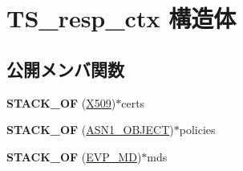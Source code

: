 \hypertarget{struct_t_s__resp__ctx}{}\section{T\+S\+\_\+resp\+\_\+ctx 構造体}
\label{struct_t_s__resp__ctx}
\subsection*{公開メンバ関数}
\begin{DoxyCompactItemize}
\item 
\hypertarget{struct_t_s__resp__ctx_aef18708d27bbe62bff39215781c83cc1}{}{\bfseries S\+T\+A\+C\+K\+\_\+\+O\+F} (\hyperlink{structx509__st}{X509})$\ast$certs\label{struct_t_s__resp__ctx_aef18708d27bbe62bff39215781c83cc1}

\item 
\hypertarget{struct_t_s__resp__ctx_a9f12f42563eb755da572b2e1c41bbee9}{}{\bfseries S\+T\+A\+C\+K\+\_\+\+O\+F} (\hyperlink{structasn1__object__st}{A\+S\+N1\+\_\+\+O\+B\+J\+E\+C\+T})$\ast$policies\label{struct_t_s__resp__ctx_a9f12f42563eb755da572b2e1c41bbee9}

\item 
\hypertarget{struct_t_s__resp__ctx_a4d642effed2757a87aa7d9aad82e6503}{}{\bfseries S\+T\+A\+C\+K\+\_\+\+O\+F} (\hyperlink{structenv__md__st}{E\+V\+P\+\_\+\+M\+D})$\ast$mds\label{struct_t_s__resp__ctx_a4d642effed2757a87aa7d9aad82e6503}

\end{DoxyCompactItemize}

